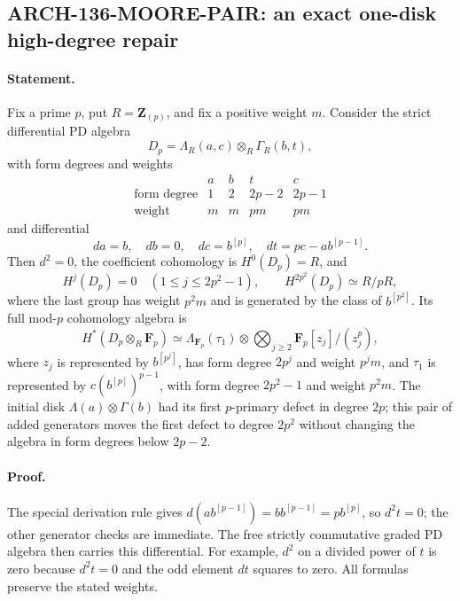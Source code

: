 \subsection{ARCH-136-MOORE-PAIR: an exact one-disk high-degree repair}
\label{sec:arch136moorepair}

\paragraph{Statement.}
Fix a prime $p$, put $R=\mathbf Z_{(p)}$, and fix a positive weight
$m$.  Consider the strict differential PD algebra
\[
 D_p=\Lambda_R(a,c)\otimes_R\Gamma_R(b,t),
\]
with form degrees and weights
\[
 \begin{array}{c|cccc}
              &a&b&t&c\\\hline
 \text{form degree}&1&2&2p-2&2p-1\\
 \text{weight}&m&m&pm&pm
 \end{array}
\]
and differential
\[
 da=b,\quad db=0,\quad dc=b^{[p]},\quad
                    dt=pc-a b^{[p-1]}.                    \tag{136.MP1}
\]
Then $d^2=0$, the coefficient cohomology is $H^0(D_p)=R$, and
\[
 H^j(D_p)=0\quad(1\leq j\leq2p^2-1),
 \qquad H^{2p^2}(D_p)\simeq R/pR,                         \tag{136.MP2}
\]
where the last group has weight $p^2m$ and is generated by the
class of $b^{[p^2]}$.  Its full mod-$p$ cohomology algebra is
\[
 H^*(D_p\otimes_R\mathbf F_p)
  \simeq \Lambda_{\mathbf F_p}(\tau_1)\otimes
       \bigotimes_{j\geq2}
                   \mathbf F_p[z_j]/(z_j^p),             \tag{136.MP3}
\]
where $z_j$ is represented by $b^{[p^j]}$, has form degree $2p^j$
and weight $p^jm$, and $\tau_1$ is represented by
$c(b^{[p]})^{p-1}$, with form degree $2p^2-1$ and weight $p^2m$.
The initial disk $\Lambda(a)\otimes\Gamma(b)$ had its first
$p$-primary defect in degree $2p$; this pair of added generators
moves the first defect to degree $2p^2$ without changing the
algebra in form degrees below $2p-2$.

\paragraph{Proof.}
The special derivation rule gives
$d(a b^{[p-1]})=b b^{[p-1]}=p b^{[p]}$, so $d^2t=0$;
the other generator checks are immediate.  The free strictly
commutative graded PD algebra then carries this differential.
For example, $d^2$ on a divided power of $t$ is zero because
$d^2t=0$ and the odd element $dt$ squares to zero.  All formulas
preserve the stated weights.

